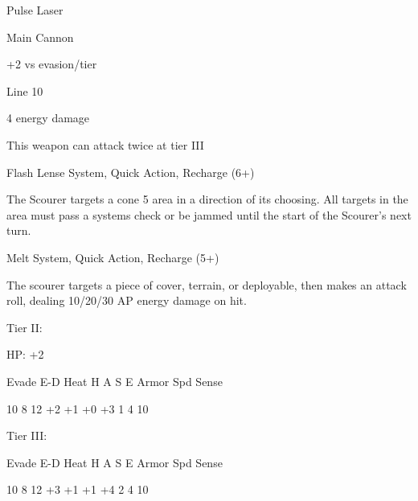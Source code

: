 Pulse Laser

Main Cannon

+2 vs evasion/tier

Line 10

4 energy damage

This weapon can attack twice at tier III


Flash Lense
System, Quick Action, Recharge (6+)

The Scourer targets a cone 5 area in a direction of its choosing. All targets in the area must pass
a systems check or be jammed until the start of the Scourer’s next turn.


Melt
System, Quick Action, Recharge (5+)

The scourer targets a piece of cover, terrain, or deployable, then makes an attack roll, dealing
10/20/30 AP energy damage on hit.


Tier II:

HP: +2


          Evade    E-D    Heat     H    A     S     E       Armor        Spd      Sense

          10       8      12       +2   +1    +0    +3      1            4        10

Tier III:


          Evade    E-D    Heat     H    A     S     E       Armor        Spd      Sense

          10       8      12       +3   +1    +1    +4      2            4        10
